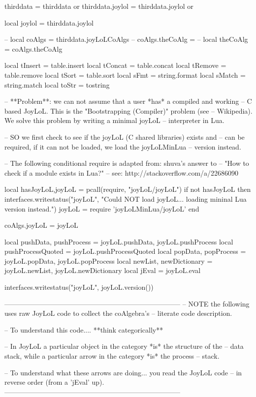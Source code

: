 thirddata        = thirddata        or {}
thirddata.joylol = thirddata.joylol or {}

local joylol   = thirddata.joylol

-- local coAlgs     = thirddata.joyLoLCoAlgs
-- coAlgs.theCoAlg  = {}
-- local theCoAlg   = coAlgs.theCoAlg


local tInsert = table.insert
local tConcat = table.concat
local tRemove = table.remove
local tSort   = table.sort
local sFmt    = string.format
local sMatch  = string.match
local toStr   = tostring

-- **Problem**: we can not assume that a user *has* a compiled and working 
-- C based JoyLoL. This is the "Bootstrapping (Compiler)" problem (see 
-- Wikipedia). We solve this problem by writing a minimal joyLoL 
-- interpreter in Lua. 

-- SO we first check to see if the joyLoL (C shared libraries) exists and 
-- can be required, if it can not be loaded, we load the joyLoLMinLua 
-- version instead. 

-- The following conditional require is adapted from: shuva's answer to 
--  "How to check if a module exists in Lua?"
-- see: http://stackoverflow.com/a/22686090

local hasJoyLoL,joyLoL = pcall(require, "joyLoL/joyLoL")
if not hasJoyLoL then
  interfaces.writestatus("joyLoL",
    "Could NOT load joyLoL... loading mininal Lua version instead.")
  joyLoL = require 'joyLoLMinLua/joyLoL'
end

coAlgs.joyLoL = joyLoL

local pushData, pushProcess = joyLoL.pushData, joyLoL.pushProcess
local pushProcessQuoted = joyLoL.pushProcessQuoted
local popData, popProcess   = joyLoL.popData, joyLoL.popProcess
local newList, newDictionary = joyLoL.newList, joyLoL.newDictionary
local jEval = joyLoL.eval

interfaces.writestatus("joyLoL", joyLoL.version())

-----------------------------------------------------------------------------
-- NOTE the following uses raw JoyLoL code to collect the coAlgebra's 
-- literate code description.

-- To understand this code.... **think categorically**

-- In JoyLoL a particular object in the category *is* the structure of the 
-- data stack, while a particular arrow in the category *is* the process 
-- stack.

-- To understand what these arrows are doing... you read the JoyLoL code 
-- in reverse order (from a 'jEval' up). 
-----------------------------------------------------------------------------

